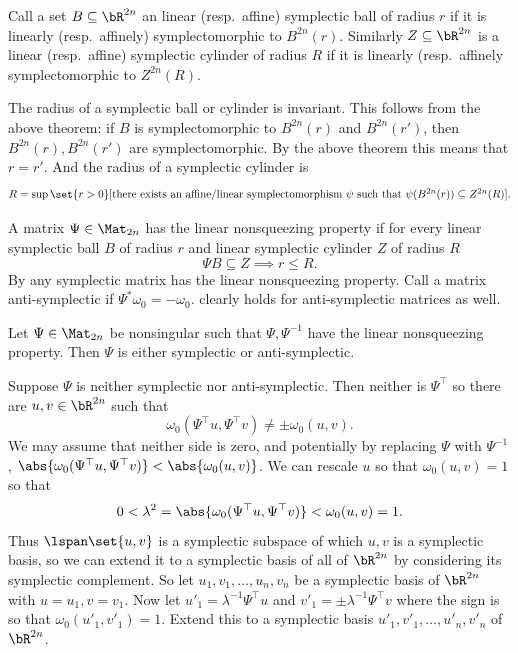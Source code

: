 Call a set $B\subseteq\bR^{2n}$ an {\emphcolor linear} (resp.\ {\emphcolor affine}) {\emphcolor symplectic ball} of radius $r$ if it is linearly (resp.\ affinely) symplectomorphic
to $B^{2n}(r)$.
Similarly $Z\subseteq\bR^{2n}$ is a {\emphcolor linear} (resp.\ {\emphcolor affine}) {\emphcolor symplectic cylinder} of radius $R$ if it is linearly (resp.\ affinely symplectomorphic
to $Z^{2n}(R)$.

The radius of a symplectic ball or cylinder is invariant.
This follows from the above theorem: if $B$ is symplectomorphic to $B^{2n}(r)$ and $B^{2n}(r')$, then $B^{2n}(r),B^{2n}(r')$ are symplectomorphic.
By the above theorem this means that $r=r'$.
And the radius of a symplectic cylinder is
$$ R = \sup\set{r>0}[\hbox{there exists an affine/linear symplectomorphism $\psi$ such that $\psi(B^{2n}(r))\subseteq Z^{2n}(R)$}] . $$

A matrix $\Psi\in\Mat_{2n}$ has the {\emphcolor linear nonsqueezing property} if for every linear symplectic ball $B$ of radius $r$ and linear symplectic cylinder $Z$ of radius $R$
$$ \Psi B\subseteq Z \implies r\leq R . $$
By  any symplectic matrix has the linear nonsqueezing property.
Call a matrix {\emphcolor anti-symplectic} if $\Psi^*\omega_0=-\omega_0$.
 clearly holds for anti-symplectic matrices as well.

\bthrm[title={The affine rigidity theorem}, name={affrigid}]

    Let $\Psi\in\Mat_{2n}$ be nonsingular such that $\Psi,\Psi^{-1}$ have the linear nonsqueezing property.
    Then $\Psi$ is either symplectic or anti-symplectic.

\ethrm

\bproof

    Suppose $\Psi$ is neither symplectic nor anti-symplectic.
    Then neither is $\Psi^\top$ so there are $u,v\in\bR^{2n}$ such that
    $$ \omega_0(\Psi^\top u,\Psi^\top v) \neq \pm\omega_0(u,v) . $$
    We may assume that neither side is zero, and potentially by replacing $\Psi$ with $\Psi^{-1}$, $\abs{\omega_0(\Psi^\top u,\Psi^\top v)}<\abs{\omega_0(u,v)}$.
    We can rescale $u$ so that $\omega_0(u,v)=1$ so that
    $$ 0 < \lambda^2 = \abs{\omega_0(\Psi^\top u,\Psi^\top v)} < \omega_0(u,v) = 1 . $$
    Thus $\lspan\set{u,v}$ is a symplectic subspace of which $u,v$ is a symplectic basis, so we can extend it to a symplectic basis of all of $\bR^{2n}$ by considering
    its symplectic complement.
    So let $u_1,v_1,\dots,u_n,v_n$ be a symplectic basis of $\bR^{2n}$ with $u=u_1,v=v_1$.
    Now let $u'_1=\lambda^{-1}\Psi^\top u$ and $v'_1=\pm\lambda^{-1}\Psi^\top v$ where the sign is so that $\omega_0(u'_1,v'_1)=1$.
    Extend this to a symplectic basis $u'_1,v'_1,\dots,u'_n,v'_n$ of $\bR^{2n}$.

